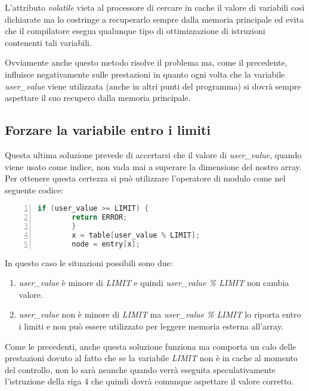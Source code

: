 		L'attributo \emph{volatile} vieta al processore di cercare in cache il valore di variabili così dichiarate ma lo costringe a recuperarlo sempre dalla memoria principale ed evita che il compilatore esegua qualunque tipo di ottimizzazione di istruzioni contenenti tali variabili.
				
		Ovviamente anche questo metodo risolve il problema ma, come il precedente, influisce negativamente sulle prestazioni in quanto ogni volta che la variabile \emph{user\_value} viene utilizzata (anche in altri punti del programma) si dovrà sempre aspettare il suo recupero dalla memoria principale.
		
		\subsection{Forzare la variabile entro i limiti}
		
		Questa ultima soluzione prevede di accertarsi che il valore di \emph{user\_value}, quando viene usato come indice, non vada mai a superare la dimensione del nostro array. Per ottenere questa certezza si può utilizzare l'operatore di modulo come nel seguente codice:
		
		\begin{lstlisting}[language={C},frame={rlbt},basicstyle=\footnotesize,numbers=left,numberstyle=\scriptsize\color{black}]
		if (user_value >= LIMIT) {
		return ERROR;
		}
		x = table[user_value % LIMIT]; 
		node = entry[x];
		\end{lstlisting}
		
		In questo caso le situazioni possibili sono due:
		
		\begin{enumerate}
			\item \emph{user\_value} è minore di \emph{LIMIT} e quindi \emph{user\_value \% LIMIT} non cambia valore.
			\item \emph{user\_value} non è minore di \emph{LIMIT} ma \emph{user\_value \% LIMIT} lo riporta entro i limiti e non può essere utilizzato per leggere memoria esterna all'array.
		\end{enumerate}
	
		Come le precedenti, anche questa soluzione funziona ma comporta un calo delle prestazioni dovuto al fatto che se la variabile \emph{LIMIT} non è in cache al momento del controllo, non lo sarà neanche quando verrà eseguita speculativamente l'istruzione della riga 4 che quindi dovrà comunque aspettare il valore corretto. 